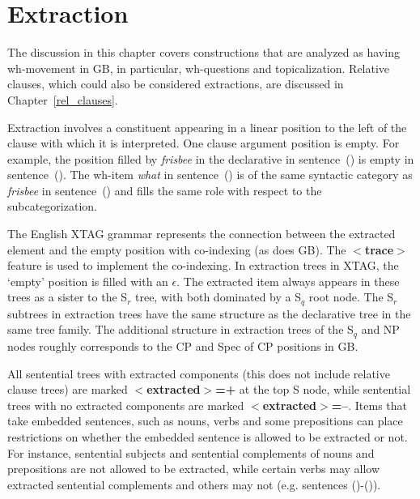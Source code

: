 \chapter{Extraction}
\label{extraction}

The discussion in this chapter covers constructions that are analyzed
as having wh-movement in GB, in particular, wh-questions and
topicalization. Relative clauses, which could also be considered
extractions, are discussed in Chapter~\ref{rel_clauses}.

Extraction involves a constituent appearing in a linear position to the left of
the clause with which it is interpreted. One clause argument position is
empty. For example, the position filled by {\it frisbee} in the declarative in
sentence~() is empty in sentence~(). The wh-item {\it what} in
sentence~() is of the same syntactic category as {\it frisbee} in
sentence~() and fills the same role with respect to the
subcategorization.



The English XTAG grammar represents the connection between the extracted
element and the empty position with co-indexing (as does GB).  The {\bf
$<$trace$>$} feature is used to implement the co-indexing.  In extraction trees
in XTAG, the `empty' position is filled with an {\it $\epsilon$}.  The
extracted item always appears in these trees as a sister to the S$_{r}$
tree, with both dominated by a S$_{q}$ root node.  The S$_{r}$ subtrees in
extraction trees have the same structure as the declarative tree in the same
tree family.  The additional structure in extraction trees of the S$_{q}$ and
NP nodes roughly corresponds to the CP and Spec of CP positions in GB.

All sentential trees with extracted components (this does not include relative
clause trees) are marked {\bf $<$extracted$>$=+} at the top S node, while
sentential trees with no extracted components are marked {\bf
$<$extracted$>$=--}.  Items that take embedded sentences, such as nouns, verbs
and some prepositions can place restrictions on whether the embedded sentence
is allowed to be extracted or not.  For instance, sentential subjects and
sentential complements of nouns and prepositions are not allowed to be
extracted, while certain verbs may allow extracted sentential complements and
others may not (e.g. sentences ()-()).

